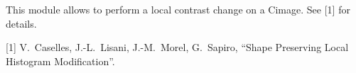 This module allows to perform a local contrast change on a Cimage.
See [1] for details.

\bigskip

[1] V.~Caselles, J.-L.~Lisani, J.-M.~Morel, G.~Sapiro,
``Shape Preserving Local Histogram Modification''.


